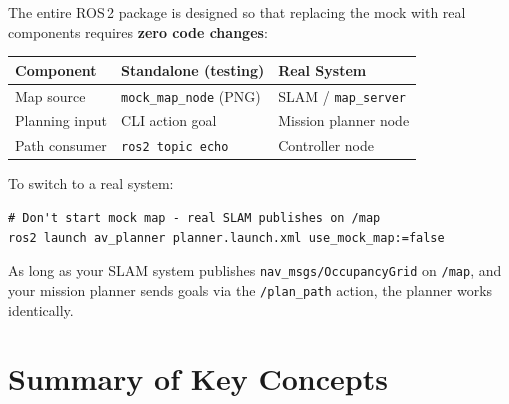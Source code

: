\documentclass[12pt, a4paper]{article}
\begin{document}
The entire ROS\,2 package is designed so that replacing the mock
with real components requires \textbf{zero code changes}:

\begin{center}
\begin{tabular}{lp{5cm}p{5cm}}
    \toprule
    \textbf{Component} & \textbf{Standalone (testing)} & \textbf{Real System} \\
    \midrule
    Map source & \texttt{mock\_map\_node} (PNG) & SLAM / \texttt{map\_server} \\
    Planning input & CLI action goal & Mission planner node \\
    Path consumer & \texttt{ros2 topic echo} & Controller node \\
    \bottomrule
\end{tabular}
\end{center}

To switch to a real system:

\begin{lstlisting}[style=bash]
# Don't start mock map - real SLAM publishes on /map
ros2 launch av_planner planner.launch.xml use_mock_map:=false
\end{lstlisting}

As long as your SLAM system publishes \texttt{nav\_msgs/OccupancyGrid}
on \texttt{/map}, and your mission planner sends goals via the
\texttt{/plan\_path} action, the planner works identically.


\section{Summary of Key Concepts}
\label{sec:summary}
\end{document}
